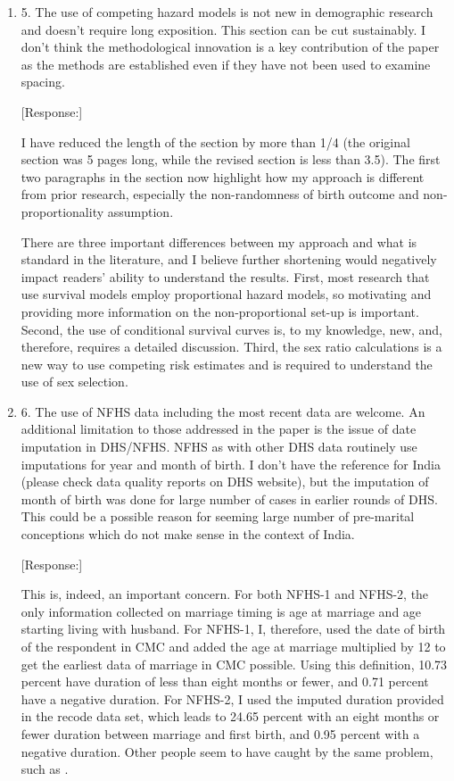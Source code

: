 \documentclass[letterpaper,12pt]{article}
\begin{document}
\begin{enumerate}
\item 5. The use of competing hazard models is not new in demographic research
and doesn’t require long exposition. This section can be cut
sustainably. I don’t think the methodological innovation is a key
contribution of the paper as the methods are established even if they
have not been used to examine spacing.

[Response:]

I have reduced the length of the section by more than 1/4 (the original section was 5
pages long, while the revised section is less than 3.5).
The first two paragraphs in the section now highlight how my approach is different from
prior research, especially the non-randomness of birth outcome and non-proportionality
assumption.

There are three important differences between my approach and what is standard
in the literature, and I believe further shortening would negatively impact readers'
ability to understand the results.
First, most research that use survival models employ proportional hazard models, so 
motivating and providing more information on the non-proportional set-up is important.
Second, the use of conditional survival curves is, to my knowledge, new, and, therefore,
requires a detailed discussion.
Third, the sex ratio calculations is a new way to use competing risk estimates and is 
required to understand the use of sex selection.


\item 6. The use of NFHS data including the most recent data are welcome. An
additional limitation to those addressed in the paper is the issue of
date imputation in DHS/NFHS. NFHS as with other DHS data routinely use
imputations for year and month of birth. I don’t have the reference for
India (please check data quality reports on DHS website), but the
imputation of month of birth was done for large number of cases in
earlier rounds of DHS. This could be a possible reason for seeming large
number of pre-marital conceptions which do not make sense in the context
of India.

[Response:]

This is, indeed, an important concern.
For both NFHS-1 and NFHS-2, the only information collected on marriage timing is age at 
marriage and age starting living with husband.
For NFHS-1, I, therefore, used the date of birth of the respondent in CMC and added the 
age at marriage multiplied by 12 to get the earliest data of marriage in CMC possible.
Using this definition, 10.73 percent have duration of less than eight months or fewer, and
0.71 percent have a negative duration.
For NFHS-2, I used the imputed duration provided in the recode data set, which leads to 
24.65 percent with an eight months or fewer duration between marriage and first birth, 
and 0.95 percent with a negative duration.
Other people seem to have caught by the same problem, such as \citet{Padmadas2004}.


\end{enumerate}
\end{document}
